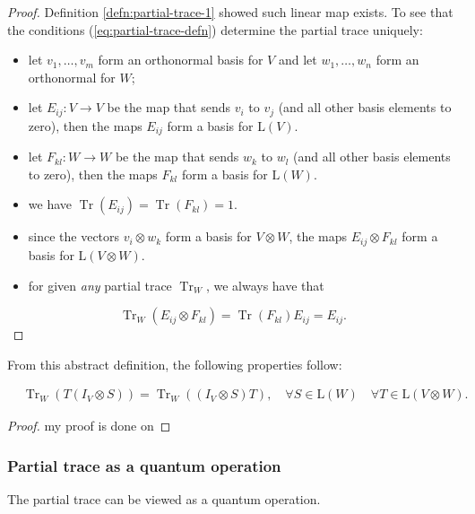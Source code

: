 \documentclass[
	11pt, %
	fleqn, %
	a4paper, %
]{LegrandOrangeBook}
\begin{document}
\begin{proof} %
Definition \ref{defn:partial-trace-1} showed such linear map exists.
To see that the conditions (\ref{eq:partial-trace-defn}) determine the partial trace uniquely:
\begin{itemize}
  \item let $v_1, \ldots, v_m$ form an orthonormal basis for $V$ and let $w_1, \ldots, w_n$ form an orthonormal for $W$;
  \item let $E_{i j}: V \rightarrow V$ be the map that sends $v_i$ to $v_j$ (and all other basis elements to zero), then the maps $E_{i j}$ form a basis for $\mathrm{L}(V)$.
  \item let $F_{k l}: W \rightarrow W$ be the map that sends $w_k$ to $w_l$ (and all other basis elements to zero), then the maps $F_{k l}$ form a basis for $\mathrm{L}(W)$.
  \item we have $\operatorname{Tr}(E_{ij})=\operatorname{Tr}(F_{kl})=1.$
  \item since the vectors $v_i \otimes w_k$ form a basis for $V \otimes W$, the maps $E_{i j} \otimes F_{k l}$ form a basis for $\mathrm{L}(V \otimes W)$.
  \item for given \textit{any} partial trace $\operatorname{Tr}_W$, we always have that
\end{itemize}
$$
\operatorname{Tr}_W(E_{i j} \otimes F_{k l})=\operatorname{Tr}(F_{k l}) E_{i j} = E_{i j}.
$$
\end{proof}

From this abstract definition, the following properties follow:

\begin{proposition}
$$
\begin{aligned}
& \operatorname{Tr}_W\left(T\left(I_V \otimes S\right)\right)=\operatorname{Tr}_W\left(\left(I_V \otimes S\right) T\right) ,\quad \forall S \in \mathrm{L}(W) \quad \forall T \in \mathrm{L}(V \otimes W).
\end{aligned}
$$
\end{proposition}

\begin{proof}
    my proof is done on
\end{proof}

\subsubsection{Partial trace as a quantum operation} %

The partial trace can be viewed as a quantum operation.
\end{document}
